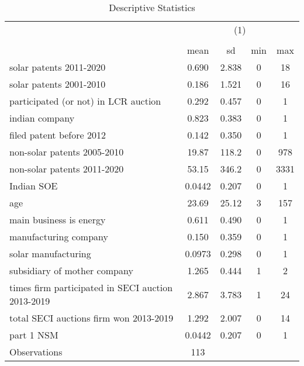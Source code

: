 \begin{table}[htbp]\centering
\def\sym#1{\ifmmode^{#1}\else\(^{#1}\)\fi}
\caption{Descriptive Statistics \label{table1}}
\begin{tabular}{l*{1}{cccc}}
\hline\hline
                    &\multicolumn{4}{c}{(1)}                            \\
                    &\multicolumn{4}{c}{}                               \\
                    &        mean&          sd&         min&         max\\
\hline
solar patents 2011-2020&       0.690&       2.838&           0&          18\\
solar patents 2001-2010&       0.186&       1.521&           0&          16\\
participated (or not) in LCR auction&       0.292&       0.457&           0&           1\\
indian company      &       0.823&       0.383&           0&           1\\
filed patent before 2012&       0.142&       0.350&           0&           1\\
non-solar patents 2005-2010&       19.87&       118.2&           0&         978\\
non-solar patents 2011-2020&       53.15&       346.2&           0&        3331\\
Indian SOE          &      0.0442&       0.207&           0&           1\\
age                 &       23.69&       25.12&           3&         157\\
main business is energy&       0.611&       0.490&           0&           1\\
manufacturing company&       0.150&       0.359&           0&           1\\
solar manufacturing &      0.0973&       0.298&           0&           1\\
subsidiary of mother company&       1.265&       0.444&           1&           2\\
times firm participated in SECI auction 2013-2019&       2.867&       3.783&           1&          24\\
total SECI auctions firm won 2013-2019&       1.292&       2.007&           0&          14\\
part 1 NSM          &      0.0442&       0.207&           0&           1\\
\hline
Observations        &         113&            &            &            \\
\hline\hline
\end{tabular}
\end{table}
